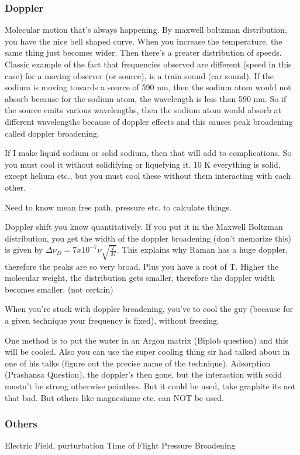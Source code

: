 	\subsubsection{Doppler}
		Molecular motion that's always happening. By maxwell boltzman distribution, you have the nice bell shaped curve. When you increase the temperature, the same thing just becomes wider. Then there's a greater distribution of speeds. Classic example of the fact that frequencies observed are different (speed in this case) for a moving observer (or source), is a train sound (car sound). If the sodium is moving towards a source of 590 nm, then the sodium atom would not absorb because for the sodium atom, the wavelength is less than 590 nm. So if the source emits various wavelengths, then the sodium atom would absorb at different wavelengths because of doppler effects and this causes peak broadening called doppler broadening.
		\par
		If I make liquid sodium or solid sodium, then that will add to complications. So you must cool it without solidifying or liquefying it. 10 K everything is solid, except helium etc., but you must cool these without them interacting with each other.
		\par
		Need to know mean free path, pressure etc. to calculate things.
		\par 
		Doppler shift you know quantitatively. If you put it in the Maxwell Boltzman distribution, you get the width of the doppler broadening (don't memorize this) is given by $\Delta \nu_D =7x10^{-7}\nu \sqrt{\frac{T}{M}} $. This explains why Raman has a huge doppler, therefore the peaks are so very broad. Plus you have a root of T. Higher the molecular weight, the distribution gets smaller, therefore the doppler width becomes smaller. (not certain)
		\par
		When you're stuck with doppler broadening, you've to cool the guy (because for a given technique your frequency is fixed), without freezing.
		\par
		One method is to put the water in an Argon matrix (Biplob question) and this will be cooled. Also you can use the super cooling thing sir had talked about in one of his talks (figure out the precise name of the technique). Adsorption (Prashansa Question), the doppler's then gone, but the interaction with solid mustn't be strong otherwise pointless. But it could be used, take graphite its not that bad. But others like magnesiume etc. can NOT be used.
	\subsubsection{Others}
		Electric Field, purturbation
		Time of Flight
		Pressure Broadening

	